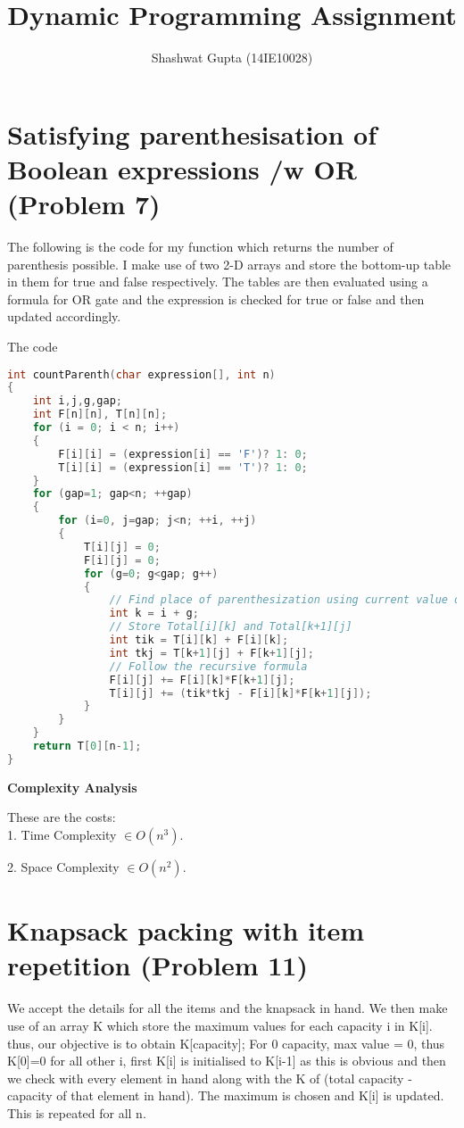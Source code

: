 \documentclass{article}
\title{Dynamic Programming Assignment}
\author{Shashwat Gupta (14IE10028)}
\begin{document}
\maketitle

\section{Satisfying parenthesisation of Boolean expressions /w OR (Problem 7)}

The following is the code for my function which returns the number of parenthesis possible. 
I make use of two 2-D arrays and store the bottom-up table in them for true and false respectively. 
The tables are then evaluated using a formula for OR gate and the expression is checked for true or false and then updated accordingly.

The code
\begin{lstlisting}[language=c, caption=Parenthesis]
int countParenth(char expression[], int n)
{
    int i,j,g,gap;
    int F[n][n], T[n][n];
    for (i = 0; i < n; i++)
    {
        F[i][i] = (expression[i] == 'F')? 1: 0;
        T[i][i] = (expression[i] == 'T')? 1: 0;
    }
    for (gap=1; gap<n; ++gap)
    {
        for (i=0, j=gap; j<n; ++i, ++j)
        {
            T[i][j] = 0;
            F[i][j] = 0;
            for (g=0; g<gap; g++)
            {
                // Find place of parenthesization using current value of gap
                int k = i + g; 
                // Store Total[i][k] and Total[k+1][j]
                int tik = T[i][k] + F[i][k];
                int tkj = T[k+1][j] + F[k+1][j];
                // Follow the recursive formula
                F[i][j] += F[i][k]*F[k+1][j];
                T[i][j] += (tik*tkj - F[i][k]*F[k+1][j]);
            }
        }
    }
    return T[0][n-1];
}
\end{lstlisting}

\textbf{Complexity Analysis}

These are the costs: \\

1. Time Complexity  $\in O(n^3)$.

2. Space Complexity  $\in O(n^2)$.

\section{Knapsack packing with item repetition (Problem 11)}

We accept the details for all the items and the knapsack in hand. We then make use of an array K which store the maximum values for each capacity i in K[i]. thus, our objective is to obtain K[capacity];
For 0 capacity, max value = 0, thus K[0]=0
for all other i, first K[i] is initialised to K[i-1] as this is obvious and then we check with every element in hand along with the K of (total capacity - capacity of that element in hand). The maximum is chosen and K[i] is updated.
This is repeated for all n.
\end{document}
